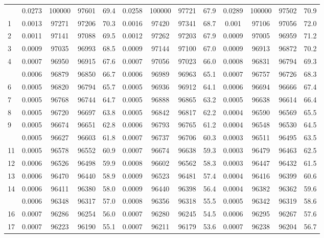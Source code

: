 \documentclass[
  14pt,
]{article}
\begin{document}
\begin{longtable}[t]{lcccccccccccc}
\endfoot
\bottomrule
\endlastfoot
0 & 0.0273 & 100000 & 97601 & 69.4 & 0.0258 & 100000 & 97721 & 67.9 & 0.0289 & 100000 & 97502 & 70.9\\
1 & 0.0013 & 97271 & 97206 & 70.3 & 0.0016 & 97420 & 97341 & 68.7 & 0.001 & 97106 & 97056 & 72.0\\
2 & 0.0011 & 97141 & 97088 & 69.5 & 0.0012 & 97262 & 97203 & 67.9 & 0.0009 & 97005 & 96959 & 71.2\\
3 & 0.0009 & 97035 & 96993 & 68.5 & 0.0009 & 97144 & 97100 & 67.0 & 0.0009 & 96913 & 96872 & 70.2\\
4 & 0.0007 & 96950 & 96915 & 67.6 & 0.0007 & 97056 & 97023 & 66.0 & 0.0008 & 96831 & 96794 & 69.3\\
\addlinespace
5 & 0.0006 & 96879 & 96850 & 66.7 & 0.0006 & 96989 & 96963 & 65.1 & 0.0007 & 96757 & 96726 & 68.3\\
6 & 0.0005 & 96820 & 96794 & 65.7 & 0.0005 & 96936 & 96912 & 64.1 & 0.0006 & 96694 & 96666 & 67.4\\
7 & 0.0005 & 96768 & 96744 & 64.7 & 0.0005 & 96888 & 96865 & 63.2 & 0.0005 & 96638 & 96614 & 66.4\\
8 & 0.0005 & 96720 & 96697 & 63.8 & 0.0005 & 96842 & 96817 & 62.2 & 0.0004 & 96590 & 96569 & 65.5\\
9 & 0.0005 & 96674 & 96651 & 62.8 & 0.0006 & 96793 & 96765 & 61.2 & 0.0004 & 96548 & 96530 & 64.5\\
\addlinespace
10 & 0.0005 & 96627 & 96603 & 61.8 & 0.0007 & 96737 & 96706 & 60.3 & 0.0003 & 96511 & 96495 & 63.5\\
11 & 0.0005 & 96578 & 96552 & 60.9 & 0.0007 & 96674 & 96638 & 59.3 & 0.0003 & 96479 & 96463 & 62.5\\
12 & 0.0006 & 96526 & 96498 & 59.9 & 0.0008 & 96602 & 96562 & 58.3 & 0.0003 & 96447 & 96432 & 61.5\\
13 & 0.0006 & 96470 & 96440 & 58.9 & 0.0009 & 96523 & 96481 & 57.4 & 0.0004 & 96416 & 96399 & 60.6\\
14 & 0.0006 & 96411 & 96380 & 58.0 & 0.0009 & 96440 & 96398 & 56.4 & 0.0004 & 96382 & 96362 & 59.6\\
\addlinespace
15 & 0.0006 & 96348 & 96317 & 57.0 & 0.0008 & 96356 & 96318 & 55.5 & 0.0005 & 96342 & 96319 & 58.6\\
16 & 0.0007 & 96286 & 96254 & 56.0 & 0.0007 & 96280 & 96245 & 54.5 & 0.0006 & 96295 & 96267 & 57.6\\
17 & 0.0007 & 96223 & 96190 & 55.1 & 0.0007 & 96211 & 96179 & 53.6 & 0.0007 & 96238 & 96204 & 56.7\\

\end{longtable}
\end{document}
